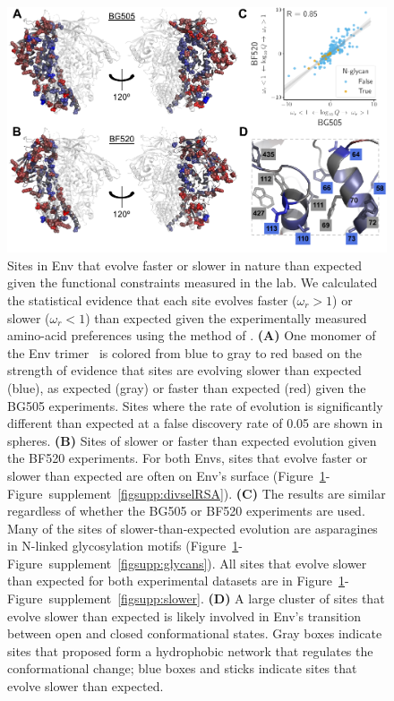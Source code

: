 \documentclass[9pt]{elife}
\begin{document}
\begin{figure}
\includegraphics[width=1.0\textwidth]{figures/omegabysite_structural_analysis/omegabysite_structural_analysis.pdf}
\caption{\label{fig:divsel}
Sites in Env that evolve faster or slower in nature than expected given the functional constraints measured in the lab.
We calculated the statistical evidence that each site evolves faster ($\omega_r > 1$) or slower ($\omega_r < 1$) than expected given the experimentally measured amino-acid preferences using the method of \citet{bloom2017identification}.
{\bf (A)}
One monomer of the Env trimer~\citep[PDB 5FYL;][]{stewart2016trimeric} is colored from blue to gray to red based on the strength of evidence that sites are evolving slower than expected (blue), as expected (gray) or faster than expected (red) given the BG505 experiments.
Sites where the rate of evolution is significantly different than expected at a false discovery rate of 0.05 are shown in spheres.
{\bf (B)}
Sites of slower or faster than expected evolution given the BF520 experiments.
For both Envs, sites that evolve faster or slower than expected are often on Env's surface (Figure~\ref{fig:divsel}-Figure~supplement~\ref{figsupp:divselRSA}).
{\bf (C)}
The results are similar regardless of whether the BG505 or BF520 experiments are used.
Many of the sites of slower-than-expected evolution are asparagines in N-linked glycosylation motifs (Figure~\ref{fig:divsel}-Figure~supplement~\ref{figsupp:glycans}).
All sites that evolve slower than expected for both experimental datasets are in Figure~\ref{fig:divsel}-Figure~supplement~\ref{figsupp:slower}.
{\bf (D)} 
A large cluster of sites that evolve slower than expected is likely involved in Env's transition between open and closed conformational states.
Gray boxes indicate sites that \citet[PDB 5VN3]{ozorowski2017open} proposed form a hydrophobic network that regulates the conformational change; blue boxes and sticks indicate sites that evolve slower than expected.
}
\end{figure}
\end{document}
